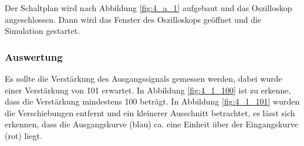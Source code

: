 \documentclass[12pt,a4paper]{article}
\begin{document}
Der Schaltplan wird nach Abbildung \ref{fig:4_a_1} aufgebaut und das Oszilloskop angeschlossen. Dann wird das Fenster des Oszilloskops geöffnet und die Simulation gestartet.


\subsubsection{Auswertung}

Es sollte die Verstärkung des Ausgangssignals gemessen werden, dabei wurde einer Verstärkung von 101 erwartet. In Abbildung \ref{fig:4_1_100} ist zu erkenne, dass die Verstärkung mindestens 100 beträgt. In Abbildung \ref{fig:4_1_101} wurden die Verschiebungen entfernt und ein kleinerer Ausschnitt betrachtet, es lässt sich erkennen, dass die Ausgangskurve (blau) ca. eine Einheit über der Eingangskurve (rot) liegt.
\end{document}
